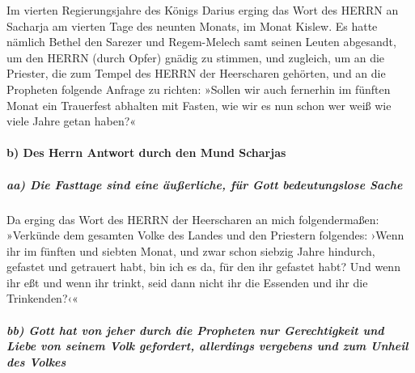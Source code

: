  Im vierten Regierungsjahre des Königs Darius erging das
Wort des HERRN an Sacharja am vierten Tage des neunten Monats, im Monat
Kislew.  Es hatte nämlich Bethel den Sarezer und
Regem-Melech samt seinen Leuten abgesandt, um den HERRN (durch Opfer)
gnädig zu stimmen,  und zugleich, um an die Priester, die
zum Tempel des HERRN der Heerscharen gehörten, und an die Propheten
folgende Anfrage zu richten: »Sollen wir auch fernerhin im fünften Monat
ein Trauerfest abhalten mit Fasten, wie wir es nun schon wer weiß wie
viele Jahre getan haben?«

\hypertarget{b-des-herrn-antwort-durch-den-mund-scharjas}{%
\paragraph{b) Des Herrn Antwort durch den Mund
Scharjas}\label{b-des-herrn-antwort-durch-den-mund-scharjas}}

\hypertarget{aa-die-fasttage-sind-eine-uxe4uuxdferliche-fuxfcr-gott-bedeutungslose-sache}{%
\subparagraph{aa) Die Fasttage sind eine äußerliche, für Gott
bedeutungslose
Sache}\label{aa-die-fasttage-sind-eine-uxe4uuxdferliche-fuxfcr-gott-bedeutungslose-sache}}

 Da erging das Wort des HERRN der Heerscharen an mich
folgendermaßen:  »Verkünde dem gesamten Volke des Landes
und den Priestern folgendes: ›Wenn ihr im fünften und siebten Monat, und
zwar schon siebzig Jahre hindurch, gefastet und getrauert habt, bin ich
es da, für den ihr gefastet habt?  Und wenn ihr eßt und
wenn ihr trinkt, seid dann nicht ihr die Essenden und ihr die
Trinkenden?‹«

\hypertarget{bb-gott-hat-von-jeher-durch-die-propheten-nur-gerechtigkeit-und-liebe-von-seinem-volk-gefordert-allerdings-vergebens-und-zum-unheil-des-volkes}{%
\subparagraph{bb) Gott hat von jeher durch die Propheten nur
Gerechtigkeit und Liebe von seinem Volk gefordert, allerdings vergebens
und zum Unheil des
Volkes}\label{bb-gott-hat-von-jeher-durch-die-propheten-nur-gerechtigkeit-und-liebe-von-seinem-volk-gefordert-allerdings-vergebens-und-zum-unheil-des-volkes}}

